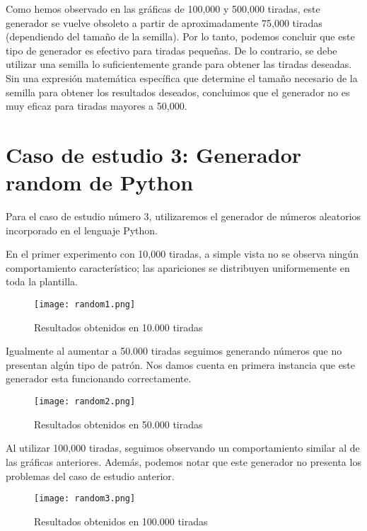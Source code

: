 \documentclass{article}
\begin{document}
Como hemos observado en las gráficas de 100,000 y 500,000 tiradas, este generador se vuelve obsoleto a partir de aproximadamente 75,000 tiradas (dependiendo del tamaño de la semilla). Por lo tanto, podemos concluir que este tipo de generador es efectivo para tiradas pequeñas. De lo contrario, se debe utilizar una semilla lo suficientemente grande para obtener las tiradas deseadas. Sin una expresión matemática específica que determine el tamaño necesario de la semilla para obtener los resultados deseados, concluimos que el generador no es muy eficaz para tiradas mayores a 50,000.

\section{Caso de estudio 3: Generador random de Python}
 
Para el caso de estudio número 3, utilizaremos el generador de números aleatorios incorporado en el lenguaje Python.

En el primer experimento con 10,000 tiradas, a simple vista no se observa ningún comportamiento característico; las apariciones se distribuyen uniformemente en toda la plantilla.

\begin{figure}[H]
    \centering
    \texttt{[image: random1.png]}
    \caption{Resultados obtenidos en 10.000 tiradas}
    \label{fig:random-10000}
\end{figure}

Igualmente al aumentar a 50.000 tiradas seguimos generando números que no presentan algún tipo de patrón. Nos damos cuenta en primera instancia que este generador esta funcionando correctamente.

\begin{figure}[H]
    \centering
    \texttt{[image: random2.png]}
    \caption{Resultados obtenidos en 50.000 tiradas}
    \label{fig:random-50000}
\end{figure}

Al utilizar 100,000 tiradas, seguimos observando un comportamiento similar al de las gráficas anteriores. Además, podemos notar que este generador no presenta los problemas del caso de estudio anterior.

\begin{figure}[H]
    \centering
    \texttt{[image: random3.png]}
    \caption{Resultados obtenidos en 100.000 tiradas}
    \label{fig:random-100000}
\end{figure}
\end{document}
